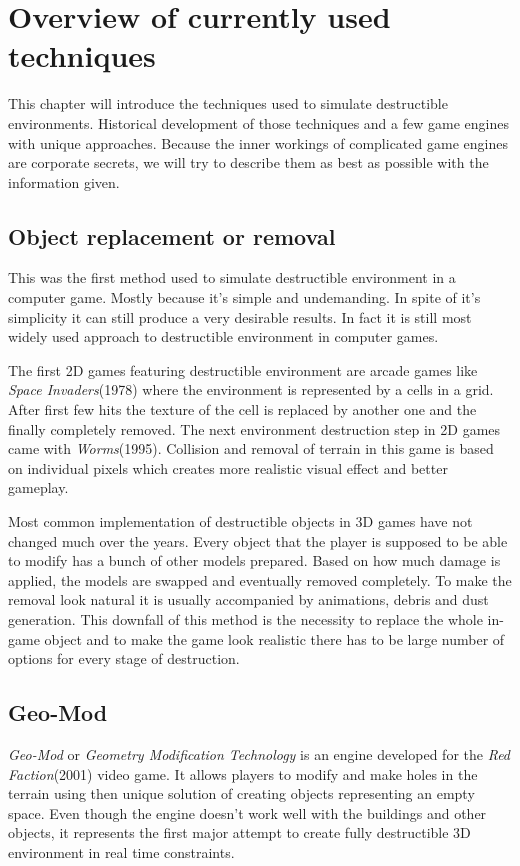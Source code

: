 \chapter{Overview of currently used techniques}
This chapter will introduce the techniques used to simulate destructible environments. Historical development of those techniques and a few game engines with unique approaches. Because the inner workings of complicated game engines are corporate secrets, we will try to describe them as best as possible with the information given.

\section{Object replacement or removal}
\par This was the first method used to simulate destructible environment in a computer game. Mostly because it's simple and undemanding. In spite of it's simplicity it can still produce a very desirable results. In fact it is still most widely used approach to destructible environment in computer games.  \par 

The first 2D games featuring destructible environment are arcade games like \emph{Space Invaders}\cite{invaders}(1978) where the environment is represented by a cells in a grid. After first few hits the texture of the cell is replaced by another one and the finally completely removed. The next environment destruction step in 2D games came with \emph{Worms}\cite{worms}(1995). Collision and removal of terrain in this game is based on individual pixels which creates more realistic visual effect and better gameplay. \par 

Most common implementation of destructible objects in 3D games have not changed much over the years. Every object that the player is supposed to be able to modify has a bunch of other models prepared. Based on how much damage is applied, the models are swapped and eventually removed completely. To make the removal look natural it is usually accompanied by animations, debris and dust generation. This downfall of this method is the necessity to replace the whole in-game object and to make the game look realistic there has to be large number of options for every stage of destruction.

\section{Geo-Mod}
\emph{Geo-Mod}\cite{geomod} or \emph{Geometry Modification Technology} is an engine developed for the \emph{Red Faction}\cite{redfaction}(2001) video game. It allows players to modify and make holes in the terrain using then unique solution of creating objects representing an empty space. Even though the engine doesn't work well with the buildings and other objects, it represents the first major attempt to create fully destructible 3D environment in real time constraints.


